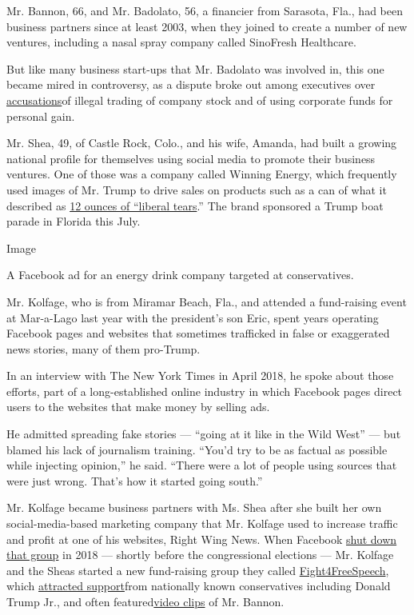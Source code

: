 Mr. Bannon, 66, and Mr. Badolato, 56, a financier from Sarasota, Fla.,
had been business partners since at least 2003, when they joined to
create a number of new ventures, including a nasal spray company called
SinoFresh Healthcare.

But like many business start-ups that Mr. Badolato was involved in, this
one became mired in controversy, as a dispute broke out among executives
over
\href{https://www.sec.gov/Archives/edgar/data/1171596/000095014405003324/g94120e10ksb.htm}{accusations}of
illegal trading of company stock and of using corporate funds for
personal gain.

Mr. Shea, 49, of Castle Rock, Colo., and his wife, Amanda, had built a
growing national profile for themselves using social media to promote
their business ventures. One of those was a company called Winning
Energy, which frequently used images of Mr. Trump to drive sales on
products such as a can of what it described as
\href{https://winning-energy.com/}{12 ounces of ``liberal tears}.'' The
brand sponsored a Trump boat parade in Florida this July.

Image

A Facebook ad for an energy drink company targeted at conservatives.

Mr. Kolfage, who is from Miramar Beach, Fla., and attended a
fund-raising event at Mar-a-Lago last year with the president's son
Eric, spent years operating Facebook pages and websites that sometimes
trafficked in false or exaggerated news stories, many of them pro-Trump.

In an interview with The New York Times in April 2018, he spoke about
those efforts, part of a long-established online industry in which
Facebook pages direct users to the websites that make money by selling
ads.

He admitted spreading fake stories --- ``going at it like in the Wild
West'' --- but blamed his lack of journalism training. ``You'd try to be
as factual as possible while injecting opinion,'' he said. ``There were
a lot of people using sources that were just wrong. That's how it
started going south.''

Mr. Kolfage became business partners with Ms. Shea after she built her
own social-media-based marketing company that Mr. Kolfage used to
increase traffic and profit at one of his websites, Right Wing News.
When Facebook
\href{https://www.facebookcorewwwi.onion/Brian.Kolfage.jr/posts/facebook-lied-they-shut-down-my-page-because-it-was-conservative-powerful-and-th/2211141405766130/}{shut
down that group} in 2018 --- shortly before the congressional elections
--- Mr. Kolfage and the Sheas started a new fund-raising group they
called
\href{https://www.facebookcorewwwi.onion/Fight4Speech/}{Fight4FreeSpeech},
which
\href{https://int.graylady3jvrrxbe.onion/data/documenttools/2018-10-don-trump-jr/2dafd9fc6596ae66/full.pdf}{attracted
support}from nationally known conservatives including Donald Trump Jr.,
and often
featured\href{https://www.facebookcorewwwi.onion/Fight4Speech/videos/734904533974973/}{video
clips} of Mr. Bannon.

